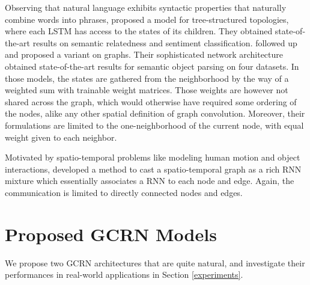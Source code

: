 \documentclass{article} %
\begin{document}
Observing that natural language exhibits syntactic properties that naturally
combine words into phrases, \citet{treelstm} proposed a model for
tree-structured topologies, where each LSTM has access to the states of its
children. They obtained state-of-the-art results on semantic relatedness and
sentiment classification. \citet{graphlstm} followed up and proposed a variant
on graphs. Their sophisticated network architecture obtained state-of-the-art
results for semantic object parsing on four datasets. In those models, the
states are gathered from the neighborhood by the way of a weighted sum with
trainable weight matrices. Those weights are however not shared across the
graph, which would otherwise have required some ordering of the nodes, alike
any other spatial definition of graph convolution. Moreover, their formulations
are limited to the one-neighborhood of the current node, with equal weight
given to each neighbor.

Motivated by spatio-temporal problems like modeling human motion and object
interactions, \citet{structuralrnn} developed a method to cast a
spatio-temporal graph as a rich RNN mixture which essentially associates a RNN
to each node and edge. Again, the communication is limited to directly
connected nodes and edges.


\section{Proposed GCRN Models}
\label{sec:our_models}


We propose two GCRN architectures that are quite natural, and investigate their performances in real-world applications in Section \ref{experiments}.
\end{document}
